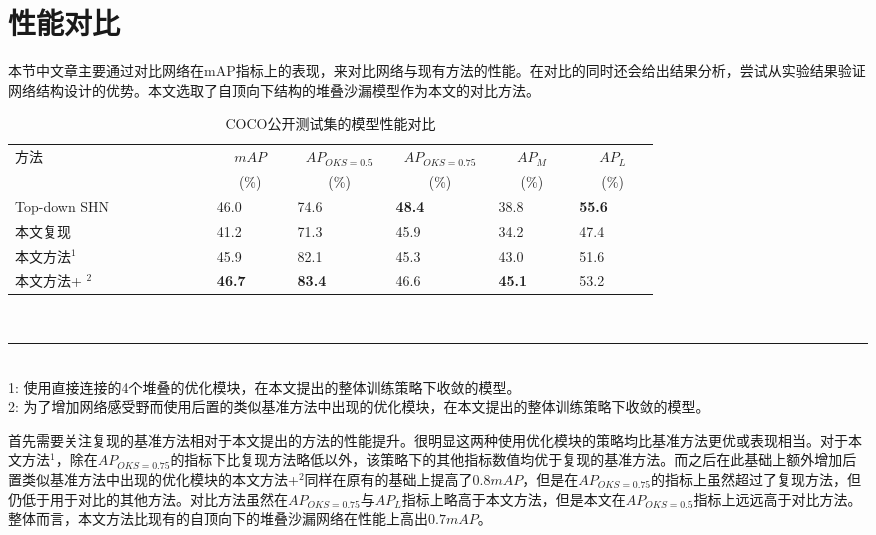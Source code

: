 \section{性能对比}
\label{sec:perfcompare}
本节中文章主要通过对比网络在mAP指标上的表现，来对比网络与现有方法的性能。在对比的同时还会给出结果分析，尝试从实验结果验证网络结构设计的优势。本文选取了自顶向下结构的堆叠沙漏模型作为本文的对比方法。
\begin{table*}[ht]
	\centering
	\caption{COCO公开测试集的模型性能对比}
	\label{tab:mAPCOCObenchmark}
	\begin{minipage}[t]{0.8\linewidth}
		\begin{tabular}{p{0.25\linewidth}p{0.1\linewidth}<{\centering}p{0.1\linewidth}<{\centering}p{0.1\linewidth}<{\centering}p{0.1\linewidth}<{\centering}p{0.1\linewidth}<{\centering}}
			\hline
			方法 & \multicolumn{1}{c}{$mAP$} & \multicolumn{1}{c}{$AP_{OKS=0.5}$} & \multicolumn{1}{c}{$AP_{OKS=0.75}$}
			& \multicolumn{1}{c}{$AP_M$} & \multicolumn{1}{c}{$AP_L$} \\
			
			& \multicolumn{1}{c}{(\%)}& \multicolumn{1}{c}{(\%)}&
			\multicolumn{1}{c}{(\%)}& \multicolumn{1}{c}{(\%)}& \multicolumn{1}{c}{
				(\%)}\\
			\hline
			Top-down SHN\cite{newell2016stacked} & 46.0 & 74.6 & \textbf{48.4} & 38.8  & \textbf{55.6} \\
			本文复现 & 41.2 & 71.3 & 45.9 & 34.2 & 47.4 \\
			本文方法$^1$ & 45.9 & 82.1 & 45.3 & 43.0 & 51.6 \\
			本文方法+ $^2$ & \textbf{46.7} & \textbf{83.4} & 46.6 & \textbf{45.1} & 53.2 \\
			\hline
		\end{tabular}\\[2pt]
		\noindent\rule{0.25\linewidth}{1pt} \\
		\footnotesize
		1: 使用直接连接的4个堆叠的优化模块，在本文提出的整体训练策略下收敛的模型。\\
		2: 为了增加网络感受野而使用后置的类似基准方法中出现的优化模块，在本文提出的整体训练策略下收敛的模型。
	\end{minipage}
\end{table*}

首先需要关注复现的基准方法相对于本文提出的方法的性能提升。很明显这两种使用优化模块的策略均比基准方法更优或表现相当。对于本文方法$^1$，除在$AP_{OKS=0.75}$的指标下比复现方法略低以外，该策略下的其他指标数值均优于复现的基准方法。而之后在此基础上额外增加后置类似基准方法中出现的优化模块的本文方法+$^2$同样在原有的基础上提高了$0.8mAP$，但是在$AP_{OKS=0.75}$的指标上虽然超过了复现方法，但仍低于用于对比的其他方法。对比方法虽然在$AP_{OKS=0.75}$与$AP_L$指标上略高于本文方法，但是本文在$AP_{OKS=0.5}$指标上远远高于对比方法。整体而言，本文方法比现有的自顶向下的堆叠沙漏网络在性能上高出$0.7mAP$。

